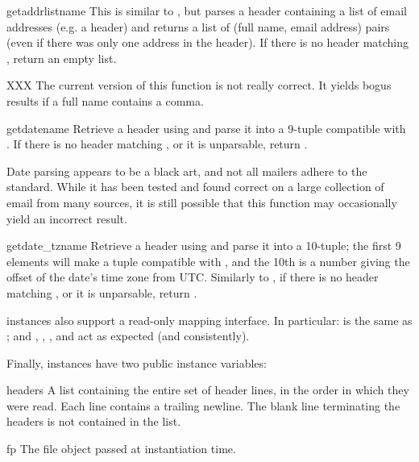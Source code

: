 \begin{funcdesc}{getaddrlist}{name}
This is similar to , but parses a header
containing a list of email addresses (e.g. a  header) and
returns a list of (full name, email address) pairs (even if there was
only one address in the header).  If there is no header matching
, return an empty list.

XXX The current version of this function is not really correct.  It
yields bogus results if a full name contains a comma.
\end{funcdesc}

\begin{funcdesc}{getdate}{name}
Retrieve a header using  and parse it into a 9-tuple
compatible with .  If there is no header matching
, or it is unparsable, return .

Date parsing appears to be a black art, and not all mailers adhere to
the standard.  While it has been tested and found correct on a large
collection of email from many sources, it is still possible that this
function may occasionally yield an incorrect result.
\end{funcdesc}

\begin{funcdesc}{getdate_tz}{name}
Retrieve a header using  and parse it into a 10-tuple;
the first 9 elements will make a tuple compatible with
, and the 10th is a number giving the offset of
the date's time zone from UTC.  Similarly to , if
there is no header matching , or it is unparsable, return
. 
\end{funcdesc}

 instances also support a read-only mapping interface.
In particular:  is the same as ;
and , , ,
 and  act as expected (and
consistently).

Finally,  instances have two public instance variables:

\begin{datadesc}{headers}
A list containing the entire set of header lines, in the order in
which they were read.  Each line contains a trailing newline.  The
blank line terminating the headers is not contained in the list.
\end{datadesc}

\begin{datadesc}{fp}
The file object passed at instantiation time.
\end{datadesc}
